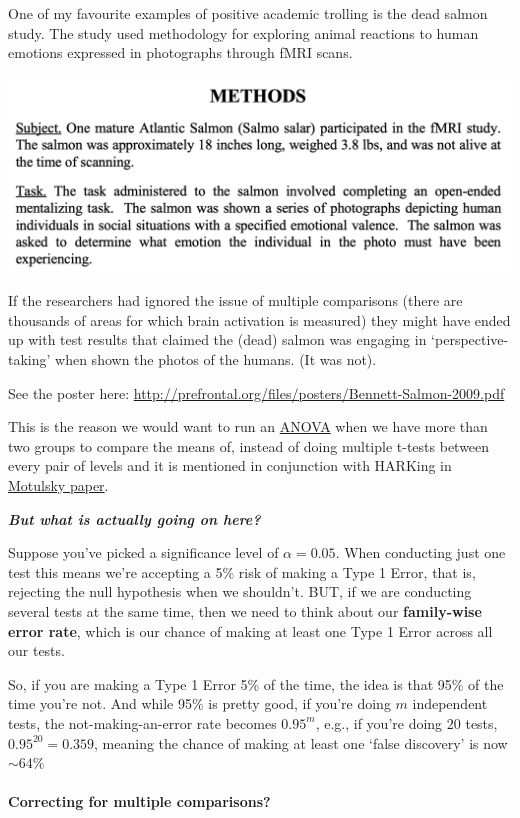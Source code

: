 \documentclass[
  openany]{book}
\begin{document}
One of my favourite examples of positive academic trolling is the dead salmon study. The study used methodology for exploring animal reactions to human emotions expressed in photographs through fMRI scans.

\begin{center}\includegraphics[width=0.6\linewidth]{images/m2/salmon} \end{center}

If the researchers had ignored the issue of multiple comparisons (there are thousands of areas for which brain activation is measured) they might have ended up with test results that claimed the (dead) salmon was engaging in `perspective-taking' when shown the photos of the humans. (It was not).

See the poster here: \url{http://prefrontal.org/files/posters/Bennett-Salmon-2009.pdf}

This is the reason we would want to run an \protect\hyperlink{anova}{ANOVA} when we have more than two groups to compare the means of, instead of doing multiple t-tests between every pair of levels and it is mentioned in conjunction with HARKing in \href{https://link.springer.com/article/10.1007\%2Fs00210-014-1037-6}{Motulsky paper}.

\textbf{\emph{But what is actually going on here?}}

Suppose you've picked a significance level of \(\alpha = 0.05\). When conducting just one test this means we're accepting a 5\% risk of making a Type 1 Error, that is, rejecting the null hypothesis when we shouldn't. BUT, if we are conducting several tests at the same time, then we need to think about our \textbf{family-wise error rate}, which is our chance of making at least one Type 1 Error across all our tests.

So, if you are making a Type 1 Error 5\% of the time, the idea is that 95\% of the time you're not. And while 95\% is pretty good, if you're doing \(m\) independent tests, the not-making-an-error rate becomes \(0.95^m\), e.g., if you're doing \(20\) tests, \(0.95^{20}=0.359\), meaning the chance of making at least one `false discovery' is now \(\sim64\%\)

\hypertarget{correcting-for-multiple-comparisons}{%
\paragraph{Correcting for multiple comparisons?}\label{correcting-for-multiple-comparisons}}
\end{document}
